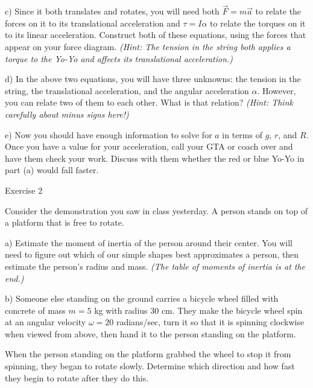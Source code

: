 \documentclass[12pt]{article}
\begin{document}
\vspace{2in}

\newpage

c) Since it both translates and rotates, you will need both $\vec F = m \vec a$ to relate the forces on it to its translational acceleration and $\tau = I \alpha$ to relate the torques on it to its linear acceleration. Construct both of these equations, using the forces that appear on your force diagram. \textit{(Hint: The tension in the string both applies a torque to the Yo-Yo and affects its translational acceleration.)}

\vspace{2.5in}

d) In the above two equations, you will have three unknowns: the tension in the string, the translational acceleration, and the angular acceleration $\alpha$. However, you can relate two of them to each other. What is that relation? \textit{(Hint: Think carefully about minus signs here!)}

\vspace{1in}

e) Now you should have enough information to solve for $a$ in terms of $g$, $r$, and $R$. Once you have a value for your acceleration, call your GTA or coach over and have them check your work. Discuss with them whether the red or blue Yo-Yo in part (a) would fall faster. 

\newpage

\begin{center}
	\Large Exercise 2
\end{center}

Consider the demonstration you saw in class yesterday. A person stands on top of a platform that is free to rotate.

a) Estimate the moment of inertia of the person around their center. You will need to figure out which of our simple shapes best approximates a person, then estimate the person's radius and mass. \textit{(The table of moments of inertia is at the end.)}

\vspace{1in}

b) Someone else standing on the ground carries a bicycle wheel filled with concrete of mass $m=5$ kg with radius 30 cm. They make the bicycle wheel spin at an angular velocity $\omega = 20$ radians/sec, turn it so that it is spinning clockwise when viewed from above, then hand it to the person standing on the platform. 

When the person standing on the platform grabbed the wheel to stop it from spinning, they began to rotate slowly. Determine which direction and how fast they begin to rotate after they do this.
\end{document}
